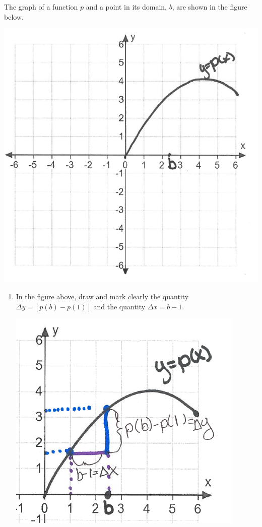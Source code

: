 \documentclass[nooutcomes]{ximera}
\begin{document}
\begin{problem}

The graph of a function $p$ and a point in its domain, $b$, are shown in the figure below.
	        \begin{image}
          \includegraphics[scale = 0.5]{Figure6.png}
        \end{image}

	\begin{enumerate}
		\item In the figure above, draw and mark clearly the quantity $\Delta y=[p(b)-p(1)]$ and the quantity $\Delta x=b-1$.
		\begin{freeResponse}\hfil
	        \begin{image}
          \includegraphics[scale = 0.7]{Figure7.png}
        \end{image}


\end{freeResponse}
\end{enumerate}
\end{problem}
\end{document}
